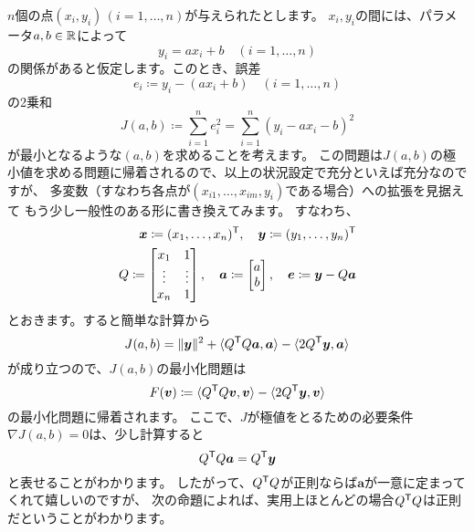 \documentclass[report]{jlreq}
\begin{document}
$n$個の点$(x_i, y_i)\, (i = 1, \dots, n)$が与えられたとします。
$x_i, y_i$の間には、パラメータ$a, b \in \mathbb{R}$によって
\begin{equation}
    y_i = a x_i + b\quad (i = 1, \dots, n)
\end{equation}
の関係があると仮定します。このとき、誤差
\begin{equation}
    e_i \coloneqq y_i - (a x_i + b)\quad (i = 1, \dots, n)
\end{equation}
の2乗和
\begin{equation}
    J(a, b) \coloneqq \sum_{i=1}^n e_i^2 = \sum_{i=1}^n (y_i - a x_i - b)^2
\end{equation}
が最小となるような$(a, b)$を求めることを考えます。
この問題は$J(a, b)$の極小値を求める問題に帰着されるので、以上の状況設定で充分といえば充分なのですが、
多変数（すなわち各点が$(x_{i1}, \dots, x_{im}, y_i)$である場合）への拡張を見据えて
もう少し一般性のある形に書き換えてみます。
すなわち、
\begin{equation}
    \begin{split}
        \bm{x} \coloneqq (x_1, \dots, x_n)^{\mathsf{T}},\quad
        \bm{y} \coloneqq (y_1, \dots, y_n)^{\mathsf{T}} \\
        Q \coloneqq \begin{bmatrix}
            x_1 & 1 \\
            \vdots & \vdots \\
            x_n & 1
        \end{bmatrix},\quad
        \bm{a} \coloneqq \begin{bmatrix}
            a \\
            b
        \end{bmatrix},\quad
        \bm{e} \coloneqq \bm{y} - Q \bm{a}
    \end{split}
\end{equation}
とおきます。すると簡単な計算から
\begin{equation}
    J(a, b) = \|\bm{y}\|^2 + \langle Q^{\mathsf{T}} Q \bm{a}, \bm{a} \rangle - \langle 2Q^{\mathsf{T}} \bm{y}, \bm{a} \rangle
\end{equation}
が成り立つので、$J(a, b)$の最小化問題は
\begin{equation}
    F(\bm{v}) \coloneqq \langle Q^{\mathsf{T}} Q \bm{v}, \bm{v} \rangle - \langle 2Q^{\mathsf{T}} \bm{y}, \bm{v} \rangle
\end{equation}
の最小化問題に帰着されます。
ここで、$J$が極値をとるための必要条件$\nabla J(a, b) = 0$は、少し計算すると
\begin{equation}
    Q^{\mathsf{T}} Q \bm{a} = Q^{\mathsf{T}} \bm{y}
    \label{eq:10:1}
\end{equation}
と表せることがわかります。
したがって、$Q^{\mathsf{T}} Q$が正則ならば$\bm{a}$が一意に定まってくれて嬉しいのですが、
次の命題によれば、実用上ほとんどの場合$Q^{\mathsf{T}} Q$は正則だということがわかります。
\end{document}
